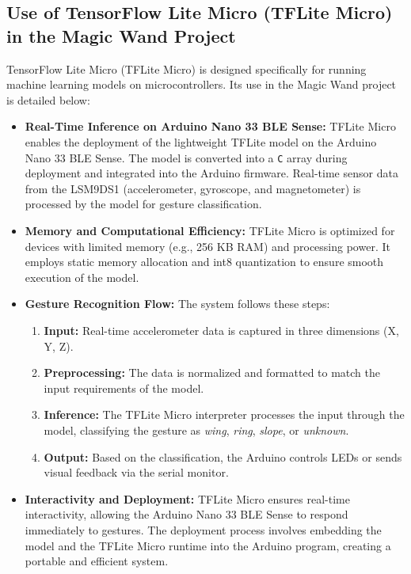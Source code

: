 \subsection{Use of TensorFlow Lite Micro (TFLite Micro) in the Magic Wand Project}
TensorFlow Lite Micro (TFLite Micro) is designed specifically for running machine learning models on microcontrollers.\cite{litert:2023} Its use in the Magic Wand project is detailed below:

\begin{itemize}
	\item \textbf{Real-Time Inference on Arduino Nano 33 BLE Sense:}
	TFLite Micro enables the deployment of the lightweight TFLite model on the Arduino Nano 33 BLE Sense. The model is converted into a \texttt{C} array during deployment and integrated into the Arduino firmware. Real-time sensor data from the LSM9DS1 (accelerometer, gyroscope, and magnetometer) is processed by the model for gesture classification.\cite{litert:2023}
	
	\item \textbf{Memory and Computational Efficiency:}
	TFLite Micro is optimized for devices with limited memory (e.g., 256 KB RAM) and processing power. It employs static memory allocation and int8 quantization to ensure smooth execution of the model.\cite{litert:2023}
	
	\item \textbf{Gesture Recognition Flow:}
	The system follows these steps:
	\begin{enumerate}
		\item \textbf{Input:} Real-time accelerometer data is captured in three dimensions (X, Y, Z).
		\item \textbf{Preprocessing:} The data is normalized and formatted to match the input requirements of the model.
		\item \textbf{Inference:} The TFLite Micro interpreter processes the input through the model, classifying the gesture as \textit{wing}, \textit{ring}, \textit{slope}, or \textit{unknown}.
		\item \textbf{Output:} Based on the classification, the Arduino controls LEDs or sends visual feedback via the serial monitor.
	\end{enumerate}
	
	\item \textbf{Interactivity and Deployment:}
	TFLite Micro ensures real-time interactivity, allowing the Arduino Nano 33 BLE Sense to respond immediately to gestures. The deployment process involves embedding the model and the TFLite Micro runtime into the Arduino program, creating a portable and efficient system.
\end{itemize}

